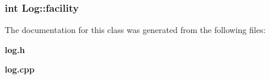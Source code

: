 \subsubsection{\setlength{\rightskip}{0pt plus 5cm}int {\bf Log::facility}\hspace{0.3cm}{\tt  [private]}}\label{classLog_844dc5894a51dce933ae2109868652a0}




The documentation for this class was generated from the following files:\begin{CompactItemize}
\item 
{\bf log.h}\item 
{\bf log.cpp}\end{CompactItemize}
